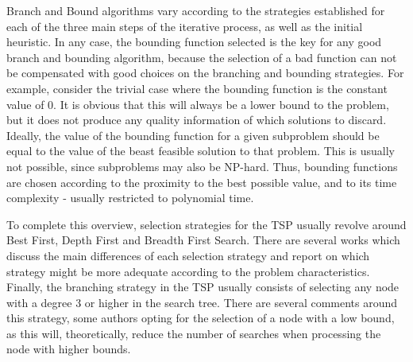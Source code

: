 Branch and Bound algorithms vary according to the strategies established for each of the three main steps of the iterative process, as well as the initial heuristic. In any case, the bounding function selected is the key for any good branch and bounding algorithm, because the selection of a bad function can not be compensated with good choices on the branching and bounding strategies. For example, consider the trivial case where the bounding function is the constant value of 0. It is obvious that this will always be a lower bound to the problem, but it does not produce any quality information of which solutions to discard. Ideally, the value of the bounding function for a given subproblem should be equal to the value of the beast feasible solution  to that problem. This is usually not possible, since subproblems may also be NP-hard. Thus, bounding functions are chosen according to the proximity to the best possible value, and to its time complexity - usually restricted to polynomial time.

To complete this overview, selection strategies for the TSP usually revolve around Best First, Depth First and Breadth First Search. There are several works which discuss the main differences of each selection strategy and report on which strategy might be more adequate according to the problem characteristics. Finally, the branching strategy in the TSP usually consists of selecting any node with a degree 3 or higher in the search tree. There are several comments around this strategy, some authors opting for the selection of a node with a low bound, as this will, theoretically, reduce the number of searches when processing the node with higher bounds.




